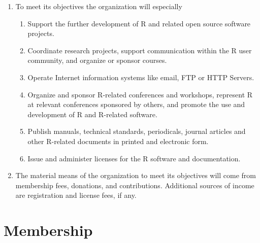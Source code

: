 \documentclass[a4paper]{article}
\begin{document}
\begin{enumerate}
 \item To meet its objectives the organization will especially
  \begin{enumerate}
   \item Support the further development of R and related open source
    software projects.
   \item Coordinate research projects, support communication within
    the R user community, and organize or sponsor courses.
   \item Operate Internet information systems like email, FTP or HTTP
    Servers.
   \item Organize and sponsor R-related conferences and workshops,
    represent R at relevant conferences sponsored by others, and
    promote the use and development of R and R-related software.
   \item Publish manuals, technical standards, periodicals, journal
    articles and other R-related documents in printed and electronic
    form.
    \item Issue and administer licenses for the R software and
     documentation.
  \end{enumerate}
  
 \item The material means of the organization to meet its objectives
  will come from membership fees, donations, and contributions.
  Additional sources of income are registration and license fees, if
  any.
\end{enumerate}

\section{Membership}
\end{document}
